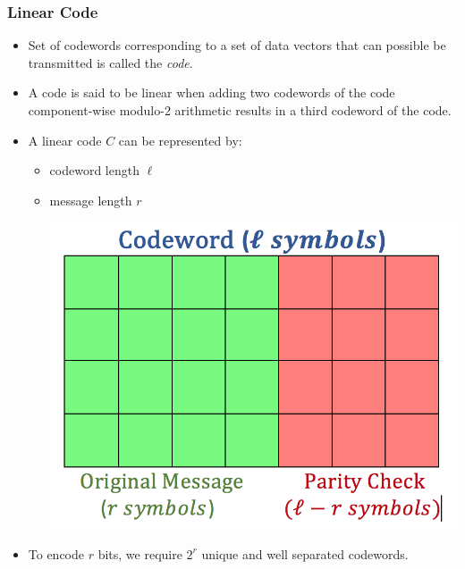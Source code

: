 \documentclass[9pt]{beamer}
\begin{document}
\begin{frame}
\frametitle{Linear Code}
\begin{itemize}
\item Set of codewords corresponding to a set of data vectors that can possible be transmitted is called the \textit{code}.
\vspace{4mm}

\item A code is said to be linear when adding two codewords of the code component-wise modulo-2 arithmetic results in a third codeword of the code.
\vspace{4mm}

\item A linear code $C$ can be represented by:
\begin{itemize}
\item codeword length $\ell$
\item message length $r$

\begin{center}
\includegraphics[scale = 0.3]{codeword.png}
\end{center}
\end{itemize}

\item To encode $r$ bits, we require $2^r$ unique and well separated codewords.

\end{itemize}
\end{frame}
\end{document}
